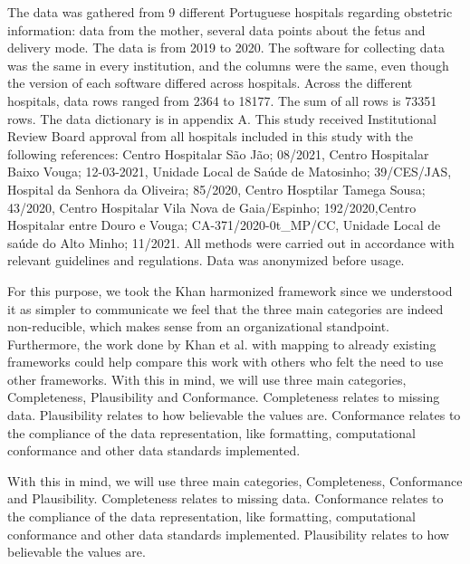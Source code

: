 The data was gathered from 9 different Portuguese hospitals regarding obstetric information: data from the mother, several data points about the fetus and delivery mode. The data is from 2019 to 2020. The software for collecting data was the same in every institution, and the columns were the same, even though the version of each software differed across hospitals. Across the different hospitals, data rows ranged from 2364 to 18177. The sum of all rows is 73351 rows. The data dictionary is in appendix A. This study received Institutional Review Board approval from all hospitals included in this study with the following references: Centro Hospitalar S{\~{a}}o J{\~{a}}o; 08/2021, Centro Hospitalar Baixo Vouga; 12-03-2021, Unidade Local de Sa\'{u}de de Matosinho; 39/CES/JAS, Hospital da Senhora da Oliveira; 85/2020, Centro Hosptilar Tamega Sousa; 43/2020, Centro Hospitalar Vila Nova de Gaia/Espinho; 192/2020,Centro Hospitalar entre Douro e Vouga; CA-371/2020-0t\_MP/CC, Unidade Local de sa\'{u}de do Alto Minho; 11/2021. All methods were carried out in accordance with relevant guidelines and regulations. Data was anonymized before usage.

For this purpose, we took the Khan harmonized framework since we understood it as simpler to communicate we feel that the three main categories are indeed non-reducible, which makes sense from an organizational standpoint. Furthermore, the work done by Khan et al. with mapping to already existing frameworks could help compare this work with others who felt the need to use other frameworks. With this in mind, we will use three main categories, Completeness, Plausibility and Conformance. Completeness relates to missing data. Plausibility relates to how believable the values are. Conformance relates to the compliance of the data representation, like formatting, computational conformance and other data standards implemented. 



With this in mind, we will use three main categories, Completeness, Conformance and Plausibility. Completeness relates to missing data. Conformance relates to the compliance of the data representation, like formatting, computational conformance and other data standards implemented. Plausibility relates to how believable the values are.

